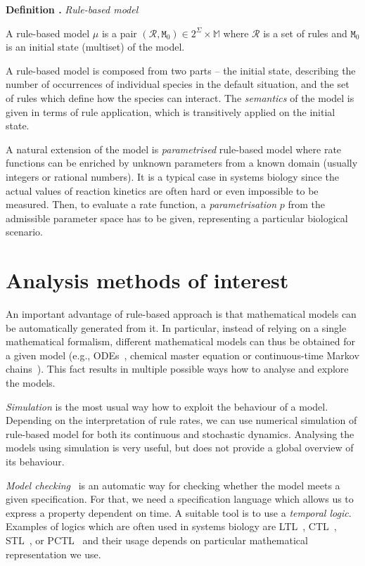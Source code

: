 \documentclass[11pt,a4paper]{report}
\newcounter{counter}[section]
\renewcommand{\thecounter}{\thechapter.\arabic{counter}}
\newenvironment{definition}[1]{\bigskip\refstepcounter{counter}\noindent\textbf{Definition \thecounter } \emph{#1} \par\nopagebreak\noindent \begin{itshape}}{\end{itshape}\bigskip}
\begin{document}
\begin{definition}{Rule-based model}
A rule-based model $\mu$ is a pair $(\mathcal{R}, \mathtt{M}_0) \in 2^\Sigma \times \mathbb{M}$ where $\mathcal{R}$ is a set of rules and $\mathtt{M}_0$ is an initial state (multiset) of the model.
\end{definition}

A rule-based model is composed from two parts -- the initial state, describing the number of occurrences of individual species in the default situation, and the set of rules which define how the species can interact. The \emph{semantics} of the model is given in terms of rule application, which is transitively applied on the initial state.

A natural extension of the model is \emph{parametrised} rule-based model where rate functions can be enriched by unknown parameters from a known domain (usually integers or rational numbers). It is a typical case in systems biology since the actual values of reaction kinetics are often hard or even impossible to be measured. Then, to evaluate a rate function, a \emph{parametrisation} $p$ from the admissible parameter space has to be given, representing a particular biological scenario.

\section{Analysis methods of interest}

An important advantage of rule-based approach is that mathematical models can be automatically generated from it. In particular, instead of relying on a single mathematical formalism, different mathematical models can thus be obtained for a given model (e.g., ODEs~\cite{KaDE}, chemical master equation or continuous-time Markov chains~\cite{Pauleve2010,sneddon2011efficient}). This fact results in multiple possible ways how to analyse and explore the models.

\emph{Simulation} is the most usual way how to exploit the behaviour of a model. Depending on the interpretation of rule rates, we can use numerical simulation of rule-based model for both its continuous and stochastic dynamics. Analysing the models using simulation is very useful, but does not provide a global overview of its behaviour.

\emph{Model checking}~\cite{clarke2018model} is an automatic way for checking whether the model meets a given specification. For that, we need a specification language which allows us to express a property dependent on time. A suitable tool is to use a \emph{temporal logic}. Examples of logics which are often used in systems biology are LTL~\cite{pnueli1977temporal}, CTL~\cite{clarke1986automatic}, STL~\cite{maler2004monitoring}, or PCTL~\cite{hasson1994logic} and their usage depends on particular mathematical representation we use.
\end{document}
